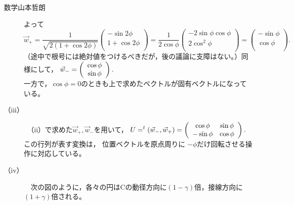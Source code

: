\documentclass[fleqn]{jbook}
\begin{document}
\begin{answer}{数学}{山本哲朗}
\begin{description}
よって
\begin{equation*}
\vec{w}_+ = \frac{1}{\sqrt{2(1+\cos 2\phi)}}
\left(
\begin{array}{c}
-\sin 2\phi \\
1+\cos 2\phi \\
\end{array}
\right) = \frac{1}{2\cos \phi}
\left(
\begin{array}{c}
-2\sin\phi\cos\phi \\
2\cos^2\phi \\
\end{array}
\right) = \left(
\begin{array}{c}
-\sin\phi \\
\cos\phi \\
\end{array}
\right) .
\end{equation*}
（途中で根号には絶対値をつけるべきだが，後の議論に支障はない。）同様にして，
$\displaystyle \vec{w}_-=\left(
\begin{array}{c}
\cos\phi \\
\sin\phi \\
\end{array}
\right) .$\\
一方で，${\cos\phi=0}$のときも上で求めたベクトルが固有ベクトルになっている。\\

        
        \item[{\rm （iii）}] 　（ii）で求めた$\vec{w}_+,\vec{w}_-$を用いて，
$\displaystyle U = ^t(\vec{w}_-,\vec{w}_+) 
=
\left(
\begin{array}{cc}
\cos\phi & \sin\phi \\
-\sin\phi & \cos\phi \\
\end{array}
\right) .$\\
この行列が表す変換は，
位置ベクトルを原点周りに
$-\phi$だけ回転させる操作に対応している。\\

        \item[{\rm （iv）}] 　次の図のように，各々の円はCの動径方向に$(1-\gamma)$倍，接線方向に$(1+\gamma)$倍される。\\
\begin{figure}[hbtp]
\begin{center}

\end{center}
\end{figure}


\end{description}
\end{answer}
\end{document}
